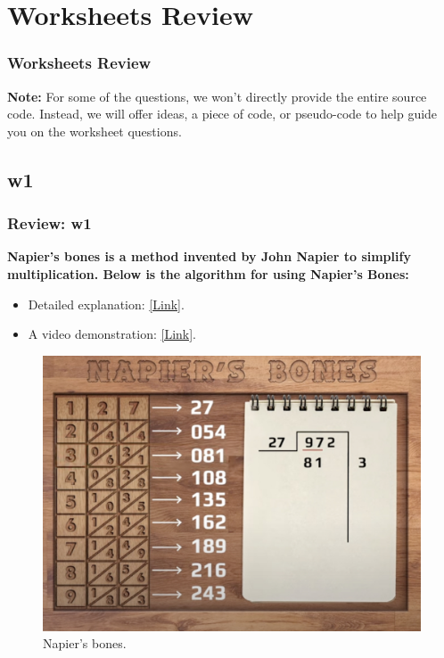 \documentclass[
	11pt, %
]{beamer}
\begin{document}

\section{Worksheets Review}

\begin{frame}
	\frametitle{Worksheets Review}

	\noindent
    \textbf{Note:} For some of the questions, we won't directly provide the entire source code. Instead, we will offer ideas, a piece of code, or pseudo-code to help guide you on the worksheet questions.



\end{frame}


\subsection{w1}

\begin{frame}
	\frametitle{Review: w1}

	\textbf{Napier's bones is a method invented by John Napier to simplify multiplication. Below is the algorithm for using Napier's Bones:}

 \begin{itemize}
    \item Detailed explanation: \href{https://mathworld.wolfram.com/NapiersBones.html}{[Link]}.
    \item A video demonstration: \href{https://www.youtube.com/watch?v=Ds21S3fCfYM}{[Link]}.
\end{itemize}


	\begin{figure}
		\includegraphics[width=0.8\linewidth]{napier.jpg}
		\caption{Napier's bones.}
	\end{figure}



\end{frame}
\end{document}
